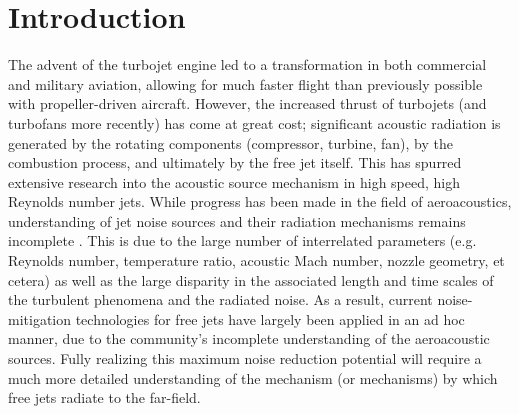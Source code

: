 \section{Introduction}
\label{introduction}
The advent of the turbojet engine led to a transformation in both commercial and military aviation, allowing for much faster flight than previously possible with propeller-driven aircraft. 
However, the increased thrust of turbojets (and turbofans more recently) has come at great cost; significant acoustic radiation is generated by the rotating components (compressor, turbine, fan), by the combustion process, and ultimately by the free jet itself. 
This has spurred extensive research into the acoustic source mechanism in high speed, high Reynolds number jets.
While progress has been made in the field of aeroacoustics, understanding of jet noise sources and their radiation mechanisms remains incomplete \citep{Jordan2008}.
This is due to the large number of interrelated parameters (e.g. Reynolds number, temperature ratio, acoustic Mach number, nozzle geometry, et cetera) as well as the large disparity in the associated length and time scales of the turbulent phenomena and the radiated noise.
As a result, current noise-mitigation technologies for free jets have largely been applied in an ad
hoc manner, due to the community's incomplete understanding of the aeroacoustic sources.
Fully realizing this maximum noise reduction potential will require a much more detailed understanding of the mechanism (or mechanisms) by which free jets radiate to the far-field.

